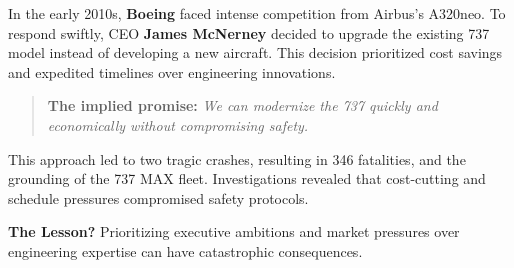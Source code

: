 \begin{tcolorbox}[colback=blue!5!white, colframe=blue!50!black,
  title={Historical Sidebar: Boeing 737 MAX — When Slides Overruled Safety}]

In the early 2010s, \textbf{Boeing} faced intense competition from Airbus's A320neo. To respond swiftly, CEO \textbf{James McNerney} decided to upgrade the existing 737 model instead of developing a new aircraft. This decision prioritized cost savings and expedited timelines over engineering innovations.


\medskip

\begin{quote}
\textbf{The implied promise:} \textit{We can modernize the 737 quickly and economically without compromising safety.}
\end{quote}

\medskip

This approach led to two tragic crashes, resulting in 346 fatalities, and the grounding of the 737 MAX fleet. Investigations revealed that cost-cutting and schedule pressures compromised safety protocols.

\medskip

\textbf{The Lesson?} Prioritizing executive ambitions and market pressures over engineering expertise can have catastrophic consequences.

\end{tcolorbox}
